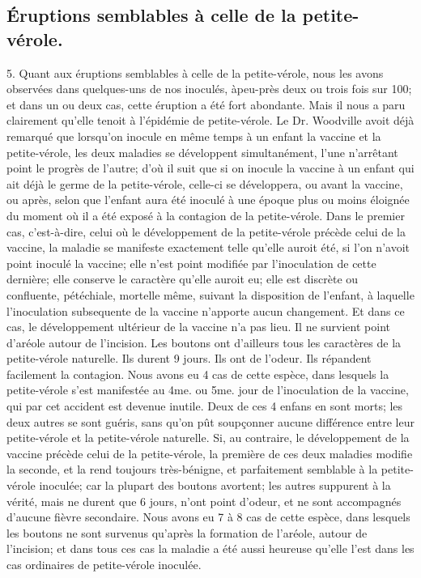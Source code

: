 \subsection{Éruptions semblables à celle de la petite-vérole.}
5. Quant aux éruptions semblables à celle de la petite-vérole, nous les avons observées dans quelques-uns de nos inoculés, àpeu-près\setcounter{page}{84} deux ou trois fois sur 100; et dans un ou deux cas, cette éruption a été fort abondante. Mais il nous a paru clairement qu'elle tenoit à l'épidémie de petite-vérole. Le Dr. Woodville avoit déjà remarqué que lorsqu'on inocule en même temps à un enfant la vaccine et la petite-vérole, les deux maladies se développent simultanément, l'une n'arrêtant point le progrès de l'autre; d'où il suit que si on inocule la vaccine à un enfant qui ait déjà le germe de la petite-vérole, celle-ci se développera, ou avant la vaccine, ou après, selon que l'enfant aura été inoculé à une époque plus ou moins éloignée du moment où il a été exposé à la contagion de la petite-vérole. Dans le premier cas, c'est-à-dire, celui où le développement de la petite-vérole précède celui de la vaccine, la maladie se manifeste exactement telle qu'elle auroit été, si l'on n'avoit point inoculé la vaccine; elle n'est point modifiée par l'inoculation de cette dernière; elle conserve le caractère qu'elle auroit eu; elle est discrète ou confluente, pétéchiale, mortelle même, suivant la disposition de l'enfant, à laquelle l'inoculation subsequente de la vaccine n'apporte aucun changement. Et dans ce cas, le développement ultérieur de la vaccine n'a pas lieu. Il ne survient point d'aréole autour de\setcounter{page}{85} l'incision. Les boutons ont d'ailleurs tous les caractères de la petite-vérole naturelle. Ils durent 9 jours. Ils ont de l'odeur. Ils répandent facilement la contagion. Nous avons eu 4 cas de cette espèce, dans lesquels la petite-vérole s'est manifestée au 4me. ou 5me. jour de l'inoculation de la vaccine, qui par cet accident est devenue inutile. Deux de ces 4 enfans en sont morts; les deux autres se sont guéris, sans qu'on pût soupçonner aucune différence entre leur petite-vérole et la petite-vérole naturelle. Si, au contraire, le développement de la vaccine précède celui de la petite-vérole, la première de ces deux maladies modifie la seconde, et la rend toujours très-bénigne, et parfaitement semblable à la petite-vérole inoculée; car la plupart des boutons avortent; les autres suppurent à la vérité, mais ne durent que 6 jours, n'ont point d'odeur, et ne sont accompagnés d'aucune fièvre secondaire. Nous avons eu 7 à 8 cas de cette espèce, dans lesquels les boutons ne sont survenus qu'après la formation de l'aréole, autour de l'incision; et dans tous ces cas la maladie a été aussi heureuse qu'elle l'est dans les cas ordinaires de petite-vérole inoculée.
